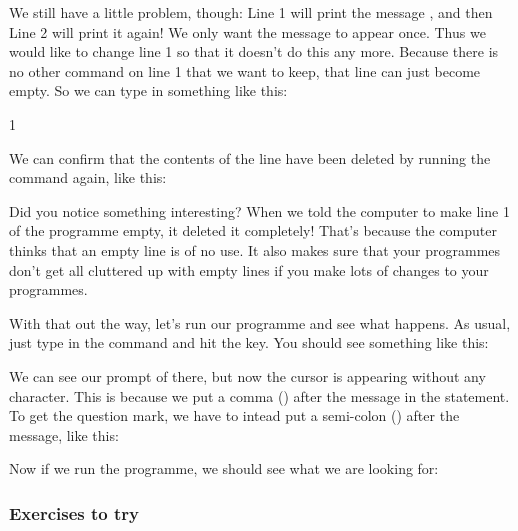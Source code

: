 
\needspace{3cm}
We still have a little problem, though: Line 1 will print the message
, and then Line 2 will print it again!
We only want the message to appear once. Thus we would like to change
line 1 so that it doesn't do this any more.  Because there is no other
command on line 1 that we want to keep, that line can just become
empty. So we can type in something like this:

\begin{screenoutput}
1
\end{screenoutput}

\needspace{4cm}
We can confirm that the contents of the line have been deleted by
running the  command again, like this:


Did you notice something interesting? When we told the computer to
make line 1 of the programme empty, it deleted it completely!
That's because the computer thinks that an empty line is of no use.
It also makes sure that your programmes don't get all cluttered up
with empty lines if you make lots of changes to your programmes.

\needspace{4cm}
With that out the way, let's run our programme and see what happens.
As usual, just type in the  command and hit the
 key.  You should see something like this:


\needspace{2.5cm}
We can see our prompt of  there, but
now the cursor is appearing without any  character. This is
because we put a comma (\stw{,}) after the message in the 
statement.  To get the question mark, we have to intead put a
semi-colon (\stw{;}) after the message, like this:


\needspace{4cm}
Now if we run the programme, we should see what we are looking for:


  \subsubsection{Exercises to try}

